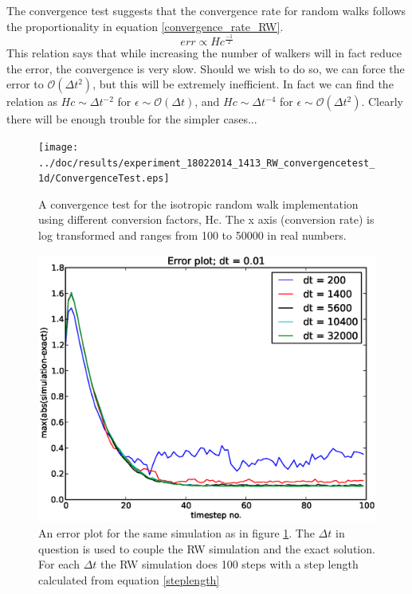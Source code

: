 The convergence test suggests that the convergence rate for random walks follows the proportionality in equation \eqref{convergence_rate_RW}. 
\begin{equation}\label{convergence_rate_RW}
err \propto Hc^{\frac{-1}{2}}
\end{equation}
This relation says that while increasing the number of walkers will in fact reduce the error, the convergence is very slow. 
Should we wish to do so, we can force the error to $\mathcal{O}(\Delta t^2)$, but this will be extremely inefficient. In fact we can find the relation as $Hc\sim\Delta t^{-2}$ for $\epsilon\sim\mathcal{O}(\Delta t)$, and $Hc\sim\Delta t^{-4}$ for $\epsilon\sim\mathcal{O}(\Delta t^2)$. 
Clearly there will be enough trouble for the simpler cases...



\begin{figure}[H]
 \centering
 \texttt{[image: ../doc/results/experiment\_18022014\_1413\_RW\_convergencetest\_1d/ConvergenceTest.eps]}
 \caption[Convergence test RW]{A convergence test for the isotropic random walk implementation using different conversion factors, Hc. The x axis (conversion rate) is log transformed and ranges from 100 to 50000 in real numbers.}
 \label{ConvergenceTestRW}
\end{figure}
\begin{figure}[H]
 \centering
 \includegraphics[scale=0.7]{../doc/results/experiment_18022014_1413_RW_convergencetest_1d/results/errorplot.eps}
 \caption[Error plot RW]{An error plot for the same simulation as in figure \ref{ConvergenceTestRW}. The $\Delta t$ in question is used to couple the RW simulation and the exact solution. For each $\Delta t$ the RW simulation does 100 steps with a step length calculated from equation \eqref{steplength}}
\end{figure}




